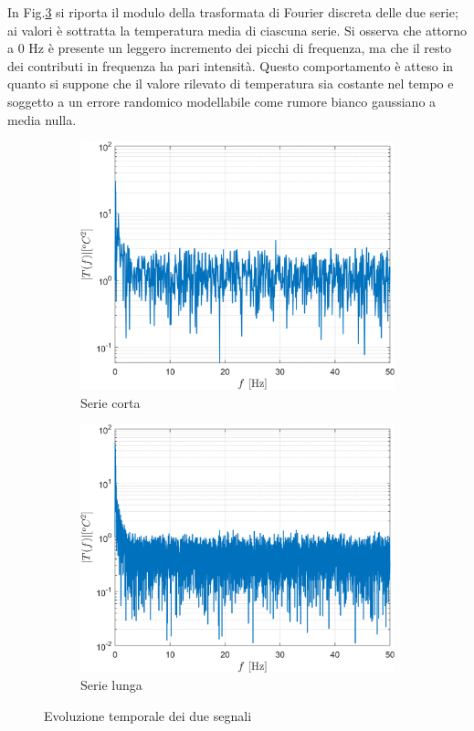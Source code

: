 In Fig.\ref{fig:ftboth} si riporta il modulo della trasformata di Fourier discreta delle due serie; ai valori è sottratta la temperatura media di ciascuna serie. 
Si osserva che attorno a 0 Hz è presente un leggero incremento dei picchi di frequenza, ma che il resto dei contributi in frequenza ha pari intensità. 
Questo comportamento è atteso in quanto si suppone che il valore rilevato di temperatura sia costante nel tempo e soggetto a un errore randomico modellabile come rumore bianco gaussiano a media nulla. 
\begin{figure}[H]
	\centering
	\begin{subfigure}{0.5\textwidth}
		\centering
		\includegraphics[width=0.95\linewidth]{"../sperimentazione nei propulsori/magplot_short"}
		\caption{Serie corta}
		\label{fig:ftshort}
	\end{subfigure}%
	\begin{subfigure}{0.5\textwidth}
		\centering
		\includegraphics[width=0.95\linewidth]{"../sperimentazione nei propulsori/magplot_long"}
		\caption{Serie lunga}
		\label{fig:ftlong}
	\end{subfigure}
	\caption{Evoluzione temporale dei due segnali}
	\label{fig:ftboth}
\end{figure}

